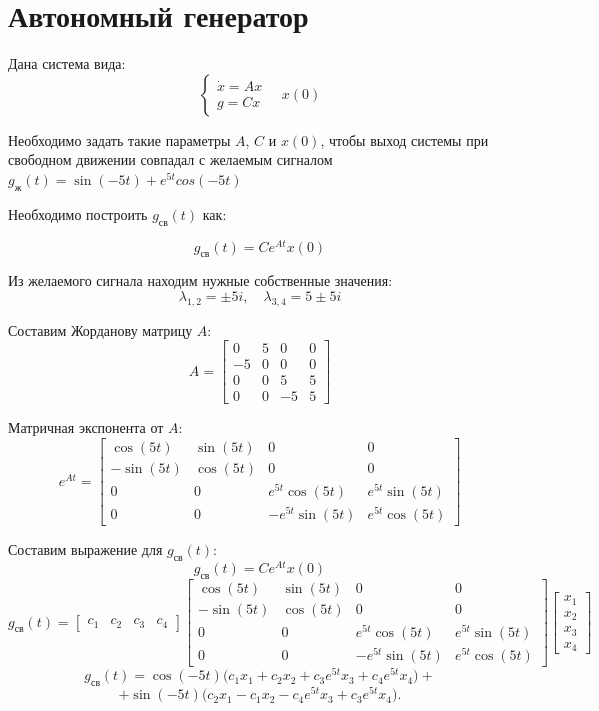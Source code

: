\chapter{Автономный генератор }
Дана система вида:
\[
    \begin{cases}
        \dot x = Ax \\
        g = Cx
    \end{cases} \quad x(0)
\]

Необходимо задать такие параметры \( A \), \( C \) и \(x(0)\),
чтобы выход системы при свободном движении совпадал с 
желаемым сигналом \( g_\text{ж}(t) = \sin(-5t) + e^{5t}cos(-5t)\)

Необходимо построить \( g_{\text{св}}(t) \) как:

\[
g_{\text{св}}(t) = C e^{At} x(0)
\]

Из желаемого сигнала находим нужные собственные значения:
\[
    \lambda_{1,2} = \pm 5i, \quad \lambda_{3,4} = 5 \pm 5i
\]

Составим Жорданову матрицу \( A \):
\[
    A = \begin{bmatrix}
        0 & 5 & 0 & 0 \\
        -5 & 0 & 0 & 0 \\
        0 & 0 & 5 & 5 \\
        0 & 0 & -5 & 5
    \end{bmatrix}
\]

Матричная экспонента от \( A \):
\[
    e^{At} = \begin{bmatrix}
        \cos(5t) & \sin(5t) & 0 & 0 \\
        -\sin(5t) & \cos(5t) & 0 & 0 \\
        0 & 0 & e^{5t}\cos(5t) & e^{5t}\sin(5t) \\
        0 & 0 & -e^{5t}\sin(5t) & e^{5t}\cos(5t)
    \end{bmatrix}
\]

Составим выражение для \( g_{\text{св}}(t) \):
\[
    g_{\text{св}}(t) = C e^{At} x(0)
\]
\[
    g_{\text{св}}(t) = 
    \begin{bmatrix}
        c_1 & c_2 & c_3 & c_4
    \end{bmatrix}
    \begin{bmatrix}
        \cos(5t) & \sin(5t) & 0 & 0 \\
        -\sin(5t) & \cos(5t) & 0 & 0 \\
        0 & 0 & e^{5t}\cos(5t) & e^{5t}\sin(5t) \\
        0 & 0 & -e^{5t}\sin(5t) & e^{5t}\cos(5t)
    \end{bmatrix} 
    \begin{bmatrix}
        x_1 \\
        x_2 \\
        x_3 \\
        x_4
    \end{bmatrix}
\]
\[
g_{\text{св}}(t) = \cos(-5t) \big(c_1 x_1 + c_2 x_2 + c_3 e^{5t} x_3 + c_4 e^{5t} x_4\big)
+
\]\[ 
+ \sin(-5t) \big(c_2 x_1 - c_1 x_2 - c_4 e^{5t} x_3 + c_3 e^{5t} x_4\big).
\]

